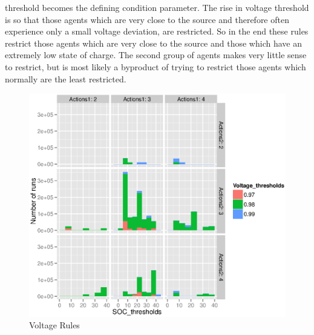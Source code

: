 \documentclass[a4paper]{article}
\begin{document}
threshold becomes the defining condition parameter. 
The rise in voltage threshold 
is so that those agents which are very close to the source and therefore often experience only a small voltage deviation, are restricted. 
So in the end these rules restrict those agents which are very close to the source and those which have an extremely low state of 
charge. The second group of agents makes very little sense to restrict, but is most likely a byproduct of trying to restrict those 
agents which normally are the least restricted. 
\begin{figure}
\centering
 \includegraphics[width = \textwidth]{rules_voltage_soc_first_look.eps}
 \caption{Voltage Rules}
 \label{colored_rules}
\end{figure}
\end{document}
